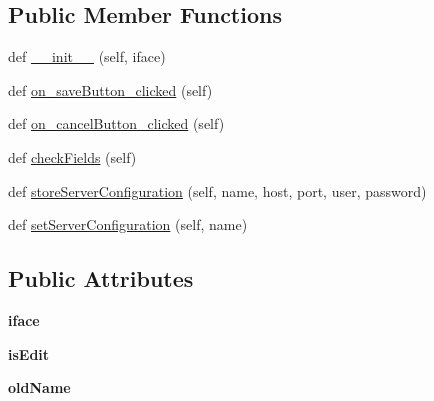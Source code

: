 \subsection*{Public Member Functions}
\begin{DoxyCompactItemize}
\item 
def \mbox{\hyperlink{class_dsg_tools_1_1_server_tools_1_1server_configurator_1_1_server_configurator_a0d4e6c6b05ef88a6b280e4e5fc6df1b2}{\+\_\+\+\_\+init\+\_\+\+\_\+}} (self, iface)
\item 
def \mbox{\hyperlink{class_dsg_tools_1_1_server_tools_1_1server_configurator_1_1_server_configurator_a9fbd48e04a2dd2c7906b77dbbf967795}{on\+\_\+save\+Button\+\_\+clicked}} (self)
\item 
def \mbox{\hyperlink{class_dsg_tools_1_1_server_tools_1_1server_configurator_1_1_server_configurator_a6050656972f6a40320b14d96f4d23dcd}{on\+\_\+cancel\+Button\+\_\+clicked}} (self)
\item 
def \mbox{\hyperlink{class_dsg_tools_1_1_server_tools_1_1server_configurator_1_1_server_configurator_a43748d9ca579f9fcd3849a3a55c4250b}{check\+Fields}} (self)
\item 
def \mbox{\hyperlink{class_dsg_tools_1_1_server_tools_1_1server_configurator_1_1_server_configurator_a1f69ad61cf3d2fe52ffd2b06f29ea5e5}{store\+Server\+Configuration}} (self, name, host, port, user, password)
\item 
def \mbox{\hyperlink{class_dsg_tools_1_1_server_tools_1_1server_configurator_1_1_server_configurator_afae33598ba82a86983ae234174a27ee6}{set\+Server\+Configuration}} (self, name)
\end{DoxyCompactItemize}
\subsection*{Public Attributes}
\begin{DoxyCompactItemize}
\item 
\mbox{\label{class_dsg_tools_1_1_server_tools_1_1server_configurator_1_1_server_configurator_a25d6baad92e7ec1134cb5880ba73064c}} 
{\bfseries iface}
\item 
\mbox{\label{class_dsg_tools_1_1_server_tools_1_1server_configurator_1_1_server_configurator_a5b131df3c4f4f968465c92d5b2b41cd5}} 
{\bfseries is\+Edit}
\item 
\mbox{\label{class_dsg_tools_1_1_server_tools_1_1server_configurator_1_1_server_configurator_a7b49dfa4e263ef2105b7f8faa3a491d2}} 
{\bfseries old\+Name}
\end{DoxyCompactItemize}


